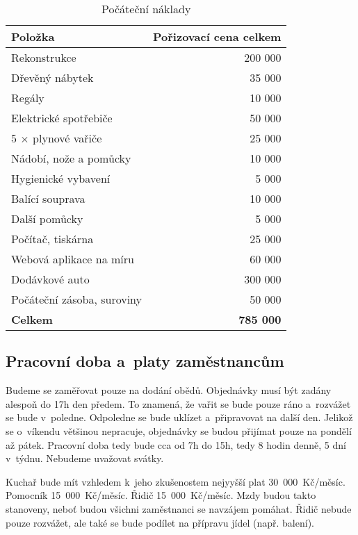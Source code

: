 \begin{table}[htbp]
\begin{center}
\begin{tabular}{ l r }

\textbf{Položka}&\textbf{Pořizovací cena celkem} \\ \hline 
Rekonstrukce & 200 000 \\ 
Dřevěný nábytek & 35 000 \\ 
Regály & 10 000 \\ 
Elektrické spotřebiče & 50 000 \\ 
5 $\times$ plynové vařiče & 25 000 \\ 
Nádobí, nože a pomůcky & 10 000 \\ 
Hygienické vybavení & 5 000 \\ 
Balící souprava & 10 000 \\ 
Další pomůcky & 5 000 \\ 
Počítač, tiskárna & 25 000 \\ 
Webová aplikace na míru & 60 000 \\ 
Dodávkové auto & 300 000 \\ 
Počáteční zásoba, suroviny & 50 000 \\ \hline 
\textbf{Celkem} & \textbf{785 000} \\

\end{tabular}
\caption{Počáteční náklady}
\label{pocatecni_naklady}
\end{center}
\end{table}

\subsection{Pracovní doba a~platy zaměstnancům}
Budeme se zaměřovat pouze na dodání obědů. Objednávky musí být zadány alespoň do 17h den předem. To znamená, že vařit se bude pouze ráno a~rozvážet se bude v~poledne. Odpoledne se bude uklízet a~připravovat na další den. Jelikož se o~víkendu většinou nepracuje, objednávky se budou přijímat pouze na pondělí až pátek. Pracovní doba tedy bude cca od 7h do 15h, tedy 8 hodin denně, 5 dní v~týdnu. Nebudeme uvažovat svátky.

Kuchař bude mít vzhledem k~jeho zkušenostem nejyyšší plat 30~000~Kč/měsíc. Pomocník 15~000~Kč/měsíc. Řidič 15~000~Kč/měsíc. Mzdy budou takto stanoveny, neboť budou všichni zaměstnanci se navzájem pomáhat. Řidič nebude pouze rozvážet, ale také se bude podílet na přípravu jídel (např. balení).





